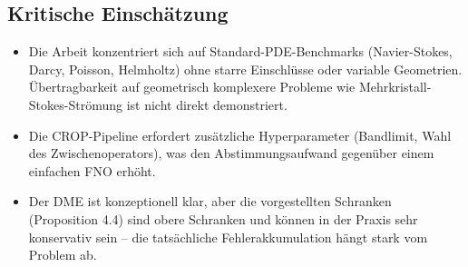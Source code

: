 \documentclass[a4paper,12pt]{article}
\begin{document}
\subsection*{Kritische Einsch\"atzung}

\begin{itemize}
  \item Die Arbeit konzentriert sich auf Standard-PDE-Benchmarks (Navier-Stokes,
    Darcy, Poisson, Helmholtz) ohne starre Einschl\"usse oder variable
    Geometrien. \"Ubertragbarkeit auf geometrisch komplexere Probleme wie
    Mehrkristall-Stokes-Str\"omung ist nicht direkt demonstriert.

  \item Die CROP-Pipeline erfordert zus\"atzliche Hyperparameter (Bandlimit,
    Wahl des Zwischenoperators), was den Abstimmungsaufwand gegen\"uber einem
    einfachen FNO erh\"oht.

  \item Der DME ist konzeptionell klar, aber die vorgestellten Schranken
    (Proposition 4.4) sind obere Schranken und k\"onnen in der Praxis sehr
    konservativ sein -- die tats\"achliche Fehlerakkumulation h\"angt stark
    vom Problem ab.
\end{itemize}
\end{document}
